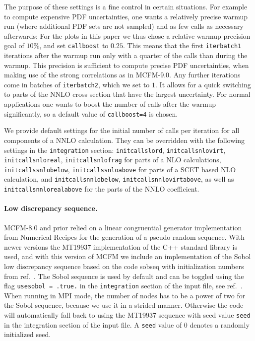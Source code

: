 The purpose of these settings is a fine control in certain situations. For example to compute expensive PDF 
uncertainties, one wants a relatively precise warmup run (where additional PDF sets are not sampled) and as few 
calls as necessary afterwards: For the plots in this paper we thus chose a relative warmup precision goal of $10\%$, 
and set \texttt{callboost} to $0.25$. This means that the first \texttt{iterbatch1} iterations after the warmup run 
only 
with a quarter of the calls than during the warmup. This precision is sufficient to compute precise PDF 
uncertainties, when making use of the strong correlations as in MCFM-9.0. Any further iterations come in batches of 
\texttt{iterbatch2}, which we set to $1$. It allows for a quick switching to parts of the NNLO cross section that 
have the largest uncertainty. For normal applications one wants to boost the number of calls after the warmup 
significantly, so a default value of \texttt{callboost=4} is chosen.

We provide default settings for the initial number of calls per iteration for all components of a NNLO calculation. 
They can be overridden with the following settings in the \texttt{integration} section: \texttt{initcallslord}, 
\texttt{initcallsnlovirt}, \texttt{initcallsnloreal}, \texttt{initcallsnlofrag} for parts of a NLO calculations,
\texttt{initcallssnlobelow}, \texttt{initcallssnloabove} for parts of a SCET based NLO calculation, and 
\texttt{initcallsnnlobelow}, \texttt{initcallsnnlovirtabove}, as well as \texttt{initcallsnnlorealabove} for the parts 
of the NNLO coefficient.

\paragraph{Low discrepancy sequence.}
MCFM-8.0 and prior relied on a linear congruential generator implementation from Numerical Recipes for the 
generation of a pseudo-random sequence. With newer versions the MT19937 implementation of the C++ standard library is 
used, and with this version of MCFM we include an implementation of the Sobol low discrepancy sequence based on the 
code sobseq \cite{Vugt2016} with initialization numbers from ref.~\cite{Joe2010}. The Sobol sequence is 
used by default and can be toggled using the flag \texttt{usesobol = .true.} in the \texttt{integration} 
section of 
the input file, see ref.~\cite{MCFM9}. When running in MPI mode, the number of nodes has to be a power 
of two for the Sobol sequence, because we use it in a strided manner. Otherwise the code will automatically fall back 
to 
using the MT19937 sequence with seed value \texttt{seed} in the integration section of the input file. A \texttt{seed} 
value of $0$ denotes a randomly initialized seed.


